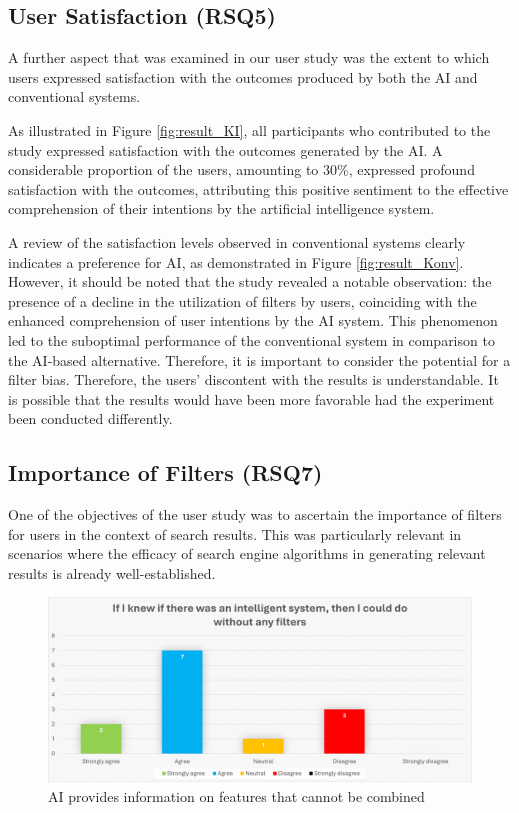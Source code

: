 \documentclass[../../submission.tex]{subfiles}
\begin{document}
\subsection{User Satisfaction (RSQ5)}
A further aspect that was examined in our user study was the extent to which 
users expressed satisfaction with the outcomes produced by both the AI and 
conventional systems.

As illustrated in Figure \ref{fig:result_KI}, all participants who contributed to the study 
expressed satisfaction with the outcomes generated by the AI.  A considerable 
proportion of the users, amounting to 30\%, expressed profound satisfaction with 
the outcomes, attributing this positive sentiment to the effective comprehension 
of their intentions by the artificial intelligence system.

A review of the satisfaction levels observed in conventional systems clearly 
indicates a preference for AI, as demonstrated in Figure \ref{fig:result_Konv}. However, it should 
be noted that the study revealed a notable observation: the presence of a decline 
in the utilization of filters by users, coinciding with the enhanced comprehension 
of user intentions by the AI system. This phenomenon led to the suboptimal performance
 of the conventional system in comparison to the AI-based alternative. 
 Therefore, it is important to consider the potential for a filter bias. 
 Therefore, the users' discontent with the results is understandable. 
 It is possible that the results would have been more favorable had the experiment 
 been conducted differently.

 \subsection{Importance of Filters (RSQ7)}
 One of the objectives of the user study was to ascertain the 
 importance of filters for users in the context of search results. 
 This was particularly relevant in scenarios where the efficacy of search 
 engine algorithms in generating relevant results is already well-established. 

 \begin{figure}[h]
    \includegraphics[width=\textwidth]{images/without_filter}
    \caption{AI provides information on features that cannot be combined}
    \Description{}
    \label{fig:without_filter}
 \end{figure}
\end{document}
